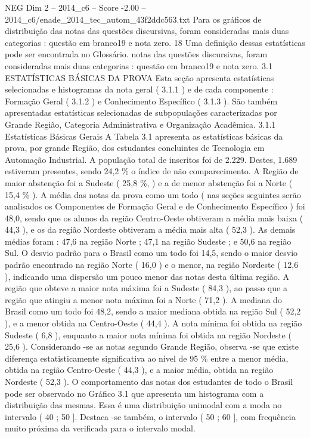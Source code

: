 \begin{textsample}{NEG Dim 2 – 2014\_c6 – Score -2.00 – 2014\_c6/enade\_2014\_tec\_autom\_43f2ddc563.txt}
Para os gráficos de distribuição das notas das questões discursivas, foram consideradas mais duas categorias : questão em branco19 e nota zero. 18 Uma definição dessas estatísticas pode ser encontrada no Glossário. notas das questões discursivas, foram consideradas mais duas categorias : questão em branco19 e nota zero. 3.1 ESTATÍSTICAS BÁSICAS DA PROVA Esta seção apresenta estatísticas selecionadas e histogramas da nota geral ( 3.1.1 ) e de cada componente : Formação Geral ( 3.1.2 ) e Conhecimento Específico ( 3.1.3 ).
São também apresentadas estatísticas selecionadas de subpopulações caracterizadas por Grande Região, Categoria Administrativa e Organização Acadêmica. 3.1.1 Estatísticas Básicas Gerais A Tabela 3.1 apresenta as estatísticas básicas da prova, por grande Região, dos estudantes concluintes de Tecnologia em Automação Industrial.
A população total de inscritos foi de 2.229.
Destes, 1.689 estiveram presentes, sendo 24,2 \% o índice de não comparecimento.
A Região de maior abstenção foi a Sudeste ( 25,8 \%, ) e a de menor abstenção foi a Norte ( 15,4 \% ).
A média das notas da prova como um todo ( nas seções seguintes serão analisados os Componentes de Formação Geral e de Conhecimento Específico ) foi 48,0, sendo que os alunos da região Centro-Oeste obtiveram a média mais baixa ( 44,3 ), e os da região Nordeste obtiveram a média mais alta ( 52,3 ).
As demais médias foram : 47,6 na região Norte ; 47,1 na região Sudeste ; e 50,6 na região Sul.
O desvio padrão para o Brasil como um todo foi 14,5, sendo o maior desvio padrão encontrado na região Norte ( 16,0 ) e o menor, na região Nordeste ( 12,6 ), indicando uma dispersão um pouco menor das notas desta última região.
A região que obteve a maior nota máxima foi a Sudeste ( 84,3 ), ao passo que a região que atingiu a menor nota máxima foi a Norte ( 71,2 ).
A mediana do Brasil como um todo foi 48,2, sendo a maior mediana obtida na região Sul ( 52,2 ), e a menor obtida na Centro-Oeste ( 44,4 ).
A nota mínima foi obtida na região Sudeste ( 6,8 ), enquanto a maior nota mínima foi obtida na região Nordeste ( 25,6 ).
Considerando -se as notas segundo Grande Região, observa -se que existe diferença estatisticamente significativa ao nível de 95 \% entre a menor média, obtida na região Centro-Oeste ( 44,3 ), e a maior média, obtida na região Nordeste ( 52,3 ).
O comportamento das notas dos estudantes de todo o Brasil pode ser observado no Gráfico 3.1 que apresenta um histograma com a distribuição das mesmas.
Essa é uma distribuição unimodal com a moda no intervalo ( 40 ; 50 ].
Destaca -se também, o intervalo ( 50 ; 60 ], com frequência muito próxima da verificada para o intervalo modal.

\end{textsample}
